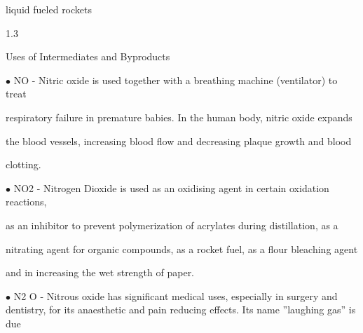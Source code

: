 \documentclass[a4paper,portrait,12pt]{article}
\begin{document}
\begin{flushleft}
liquid fueled rockets
\end{flushleft}





1.3





\begin{flushleft}
Uses of Intermediates and Byproducts
\end{flushleft}





\begin{flushleft}
$\bullet$ NO - Nitric oxide is used together with a breathing machine (ventilator) to treat
\end{flushleft}


\begin{flushleft}
respiratory failure in premature babies. In the human body, nitric oxide expands
\end{flushleft}


\begin{flushleft}
the blood vessels, increasing blood flow and decreasing plaque growth and blood
\end{flushleft}


\begin{flushleft}
clotting.
\end{flushleft}


\begin{flushleft}
$\bullet$ NO2 - Nitrogen Dioxide is used as an oxidising agent in certain oxidation reactions,
\end{flushleft}


\begin{flushleft}
as an inhibitor to prevent polymerization of acrylates during distillation, as a
\end{flushleft}


\begin{flushleft}
nitrating agent for organic compounds, as a rocket fuel, as a flour bleaching agent
\end{flushleft}


\begin{flushleft}
and in increasing the wet strength of paper.
\end{flushleft}


\begin{flushleft}
$\bullet$ N2 O - Nitrous oxide has significant medical uses, especially in surgery and dentistry, for its anaesthetic and pain reducing effects. Its name ''laughing gas'' is due
\end{flushleft}
\end{document}
